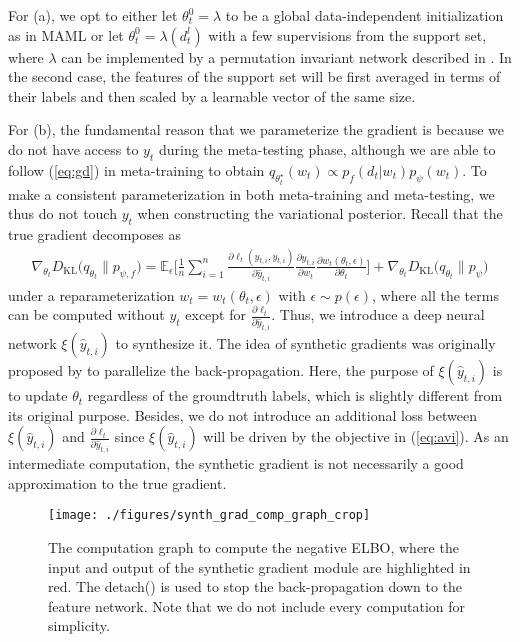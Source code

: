 \documentclass{article} \usepackage{iclr2020_conference,times}
\def\eqref#1{(\ref{#1})}
\def\rw{{w}}
\newcommand{\E}{\mathbb{E}}
\newcommand{\nt}{n}
\newcommand{\supp}{l}
\begin{document}
For (a), we opt to either let $\theta_t^0 = \lambda$ to be a global data-independent initialization as in MAML \citep{finn2017model}
or let $\theta_t^0 = \lambda(d_t^\supp)$ with a few supervisions from the support set,
where $\lambda$ can be implemented by a permutation invariant network described in \citet{gidaris2018dynamic}. 
In the second case, the features of the support set will be first averaged in terms of their labels
and then scaled by a learnable vector of the same size.

For (b), the fundamental reason that we parameterize the gradient is because we do not have access to $y_t$ during the meta-testing phase, although
we are able to follow \eqref{eq:gd} in meta-training to obtain $q_{\theta_t^\star}(w_t) \propto p_f(d_t | w_t) p_{\psi}(\rw_t)$.
To make a consistent parameterization in both meta-training and meta-testing, we thus do not touch $y_t$ when constructing the variational posterior.  
Recall that the true gradient decomposes as
\begin{align}
\nabla_{\theta_t} D_\text{KL}\Big( q_{\theta_t} \| p_{\psi, f} \Big) = 
    \E_\epsilon \Big[ \frac{1}{n} \sum_{i=1}^{\nt} \frac{\partial \ell_t(\hat{y}_{t,i}, y_{t,i})}{\partial \hat{y}_{t,i}}  
    \frac{\partial \hat{y}_{t,i}}{\partial w_t} 
    \frac{\partial w_t(\theta_t, \epsilon)}{\partial \theta_t} \Big]
    + \nabla_{\theta_t} D_\text{KL}\Big( q_{\theta_t} \| p_{\psi} \Big)
\end{align}
under a reparameterization $w_t = w_t(\theta_t, \epsilon)$ with $\epsilon \sim p(\epsilon)$,
where all the terms can be computed without $y_{t}$ 
except for $\frac{\partial \ell_t}{\partial \hat{y}_{t,i}}$.
Thus, we introduce a deep neural network $\xi(\hat{y}_{t,i})$ to synthesize it.
The idea of synthetic gradients was originally proposed by \citet{jaderberg2017decoupled} to 
parallelize the back-propagation. Here, the purpose of $\xi(\hat{y}_{t,i})$ is to update $\theta_t$ regardless of the groundtruth labels,
which is slightly different from its original purpose. 
Besides, we do not introduce an additional loss 
between $\xi(\hat{y}_{t,i})$ and $\frac{\partial \ell_t}{\partial \hat{y}_{t,i}}$
since $\xi(\hat{y}_{t,i})$ will be driven by the objective in \eqref{eq:avi}.
As an intermediate computation, the synthetic gradient is not necessarily a good approximation to the true gradient.



\begin{figure*}[t]
    \centering
    \texttt{[image: ./figures/synth\_grad\_comp\_graph\_crop]}\\
    \caption{The computation graph to compute the negative ELBO, 
    where the input and output of the synthetic gradient module are highlighted in red.
    The detach() is used to stop the back-propagation down to the feature network.
Note that we do not include every computation for simplicity.
    }
	\label{fig:cg}
\end{figure*}
\end{document}
